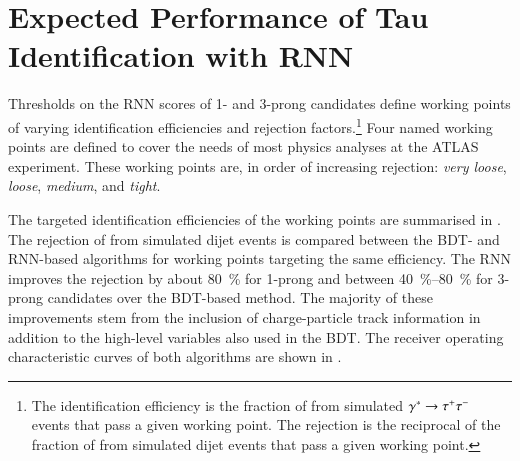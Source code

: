 \section{Expected Performance of Tau Identification with RNN}%
\label{sec:tauid_perf}

Thresholds on the RNN scores of 1- and 3-prong \tauhadvis candidates define
working points of varying \tauhadvis identification efficiencies and
\faketauhadvis rejection factors.\footnote{The \tauhadvis identification
  efficiency is the fraction of \truetauhadvis from simulated
  $\gammastar \to \tautau$ events that pass a given working point. The
  \faketauhadvis rejection is the reciprocal of the fraction of \faketauhadvis
  from simulated dijet events that pass a given working point.} Four named
working points are defined to cover the needs of most physics analyses at the
ATLAS experiment. These working points are, in order of increasing
\faketauhadvis rejection: \emph{very loose}, \emph{loose}, \emph{medium}, and
\emph{tight}.

The targeted \tauhadvis identification efficiencies of the working points are
summarised in . The rejection of \faketauhadvis from simulated
dijet events is compared between the BDT- and RNN-based \tauid algorithms for
working points targeting the same \tauhadvis efficiency. The RNN \tauid improves
the \faketauhadvis rejection by about \SI{80}{\percent} for 1-prong and between
\SIrange{40}{80}{\percent} for 3-prong \tauhadvis candidates over the BDT-based
method. The majority of these improvements stem from the inclusion of
charge-particle track information in addition to the high-level variables also
used in the BDT. The receiver operating characteristic curves of both algorithms
are shown in .

\begin{table}[htbp]
  \centering

  \caption[Comparison of working points defined for the BDT and RNN-based
  \tauid.]{Comparison of working points defined for the BDT and RNN-based
    \tauid. Only the targeted \tauhadvis efficiency (target \tauhadvis eff.) of
    the working points is given which can deviate by ca.\ \SI{1}{\percent} from
    the actual efficiency observed in simulated $\gammastar \to \tautau$
    events. The \faketauhadvis rejection is evaluated using the \tauhadvis
    candidate sample from dijet events. The table is adapted from
    Ref.~\cite{ATL-PHYS-PUB-2019-033}.}%
  \label{tab:rnn_wps}

  
\end{table}


